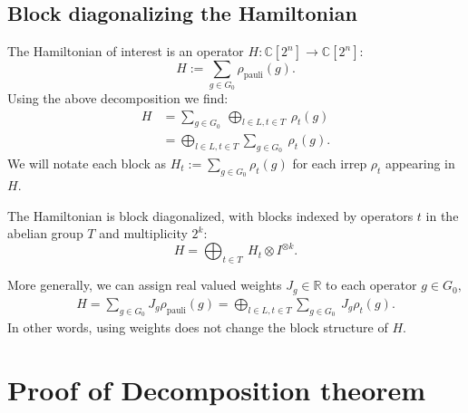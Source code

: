 \documentclass[11pt,oneside]{article}
\def\Complex{\mathbb{C}}
\def\R{\mathbb{R}}
\def\Ham{H}
\renewenvironment{framed}
{\begin{samepage}
\MakeFramed{\hsize0.8\linewidth\advance\hsize-\width\FrameRestore}}
{\endMakeFramed\end{samepage}}
\begin{document}
\subsection{Block diagonalizing the Hamiltonian}\label{Sec35}

The Hamiltonian of interest is 
an operator $\Ham:\Complex[2^n]\to\Complex[2^n]$:
$$ \Ham := \sum_{g\in G_0} \rho_{\mathrm{pauli}}(g).$$
Using the above decomposition we find:
\begin{align*}
    \Ham &= \sum_{g\in G_0}\ \bigoplus_{l\in L, t\in T}\ \rho_t(g)\\
         &= \bigoplus_{l\in L, t\in T} \sum_{g\in G_0}\ \rho_t(g).
\end{align*}
We will notate each block as
$\Ham_t := \sum_{g\in G_0}\rho_t(g)$
for each irrep $\rho_t$ appearing in $\Ham.$
\begin{framed}
\noindent
The Hamiltonian is block diagonalized, with blocks indexed by operators $t$ in
the abelian group $T$ and multiplicity $2^k:$
$$
    \Ham =  \bigoplus_{t\in T}\ \Ham_t \otimes I^{\otimes k}.
$$
\end{framed}

More generally, we can assign real valued weights
$J_g\in\R$
to each operator $g\in G_0,$
\begin{align*}
    \Ham = \sum_{g\in G_0} J_g \rho_{\mathrm{pauli}}(g)
            = \bigoplus_{l\in L, t\in T} \sum_{g\in G_0}\ J_g \rho_t(g).
\end{align*}
In other words, using weights does not change the block structure of $\Ham.$

%
%

\section{Proof of Decomposition theorem}\label{Sec36}
\end{document}
